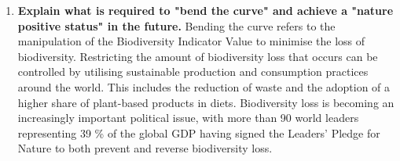 \begin{enumerate}
		\item \textbf{Explain what is required to "bend the curve" and achieve a "nature positive status" in the future.}
			\subitem Bending the curve refers to the manipulation of the Biodiversity Indicator Value to minimise the loss of biodiversity. Restricting the amount of biodiversity loss that occurs can be controlled by utilising sustainable production and consumption practices around the world. This includes the reduction of waste and the adoption of a higher share of plant-based products in diets. Biodiversity loss is becoming an increasingly important political issue, with more than 90 world leaders representing 39 \% of the global GDP having signed the Leaders' Pledge for Nature to both prevent and reverse biodiversity loss.
	\end{enumerate}






